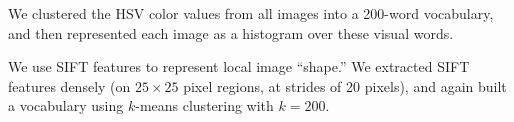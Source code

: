 We clustered the  HSV color values from
all images
 into a 200-word vocabulary,
and then represented each image as a histogram over these visual words.








	
 We use SIFT features to represent
  local image ``shape.'' We extracted SIFT features densely (on $25
  \times 25$ pixel regions,  at strides of 20 pixels), and
  again built a vocabulary using $k$-means clustering with $k=200$.

